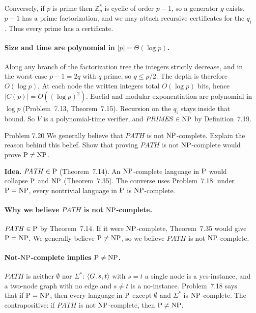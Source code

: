 \begin{soln}
Conversely, if $p$ is prime then $\mathbb{Z}_p^*$ is cyclic of order $p-1$, so a generator $g$ exists, $p-1$ has a prime factorization, and we may attach recursive certificates for the $q_i$. Thus every prime has a certificate.

\paragraph{Size and time are polynomial in $|p|=\Theta(\log p)$.}
Along any branch of the factorization tree the integers strictly decrease, and in the worst case $p-1=2q$ with $q$ prime, so $q\le p/2$. The depth is therefore $O(\log p)$. At each node the written integers total $O(\log p)$ bits, hence $|C(p)|=O((\log p)^2)$. Euclid and modular exponentiation are polynomial in $\log p$ (Problem~7.13, Theorem~7.15). Recursion on the $q_i$ stays inside that bound. So $V$ is a polynomial-time verifier, and $\mathit{PRIMES}\in\mathrm{NP}$ by Definition~7.19.
\end{soln}

\begin{question}{Problem 7.20}
We generally believe that $\mathit{PATH}$ is not $\mathrm{NP}$-complete. Explain the reason behind this belief. Show that proving $\mathit{PATH}$ is not $\mathrm{NP}$-complete would prove $\mathrm{P}\neq\mathrm{NP}$.
\end{question}
\begin{soln}
\textbf{Idea.} $\mathit{PATH}\in\mathrm{P}$ (Theorem~7.14). An $\mathrm{NP}$-complete language in $\mathrm{P}$ would collapse $\mathrm{P}$ and $\mathrm{NP}$ (Theorem~7.35). The converse uses Problem~7.18: under $\mathrm{P}=\mathrm{NP}$, every nontrivial language in $\mathrm{P}$ is $\mathrm{NP}$-complete.

\paragraph{Why we believe $\mathit{PATH}$ is not $\mathrm{NP}$-complete.}
$\mathit{PATH}\in\mathrm{P}$ by Theorem~7.14. If it were $\mathrm{NP}$-complete, Theorem~7.35 would give $\mathrm{P}=\mathrm{NP}$. We generally believe $\mathrm{P}\neq\mathrm{NP}$, so we believe $\mathit{PATH}$ is not $\mathrm{NP}$-complete.

\paragraph{Not-$\mathrm{NP}$-complete implies $\mathrm{P}\neq\mathrm{NP}$.}
$\mathit{PATH}$ is neither $\emptyset$ nor $\Sigma^*$: $\langle G,s,t\rangle$ with $s=t$ a single node is a yes-instance, and a two-node graph with no edge and $s\neq t$ is a no-instance. Problem~7.18 says that if $\mathrm{P}=\mathrm{NP}$, then every language in $\mathrm{P}$ except $\emptyset$ and $\Sigma^*$ is $\mathrm{NP}$-complete. The contrapositive: if $\mathit{PATH}$ is not $\mathrm{NP}$-complete, then $\mathrm{P}\neq\mathrm{NP}$.
\end{soln}

